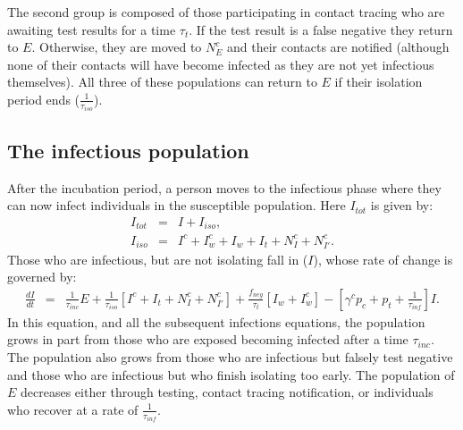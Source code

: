 \documentclass[notitlepage, superscriptaddress]{revtex4-2}
\begin{document}
The second group is composed of those participating in contact tracing who are awaiting test results for a time $\tau_{t}$. If the test result is a false negative they return to $E$. Otherwise, they are moved to $N^{c}_{E}$ and their contacts are notified (although none of their contacts will have become infected as they are not yet infectious themselves). All three of these populations can return to $E$ if their isolation period ends ($\frac{1}{\tau_{iso}}$).

\subsection{The infectious population}

After the incubation period, a person moves to the infectious phase where they can now infect individuals in the susceptible population. Here $I_{tot}$ is given by:
\begin{eqnarray}
\label{E:Itot}
I_{tot} &=& I + I_{iso}, \\ 
%
I_{iso} &=& I^{c} + I^{c}_{w} + I_{w} + I_{t} + N^{c}_{I} + N^{c}_{I'}.
\end{eqnarray}
 Those who are infectious, but are not isolating fall in ($I$), whose rate of change is governed by:
\begin{eqnarray}
\label{E:dI}
\frac{dI}{dt} &=& \frac{1}{\tau_{inc}}E  + \frac{1}{\tau_{iso}}[I^{c} + I_{t} + N^{c}_{I} + N^{c}_{I'}] + \frac{f_{neg}}{\tau_{t}}[I_{w} + I^{c}_{w}] -  [\gamma^{c} p_{c} +p_{t} + \frac{1}{\tau_{inf}}] I.
\end{eqnarray}
In this equation, and all the subsequent infections equations, the population grows in part from those who are exposed becoming infected after a time $\tau_{inc}$. The population also grows from those who are infectious but falsely test negative and those who are infectious but who finish isolating too early. The population of $E$ decreases either through testing, contact tracing notification, or individuals who recover at a rate of $\frac{1}{\tau_{inf}}$. 
\end{document}
